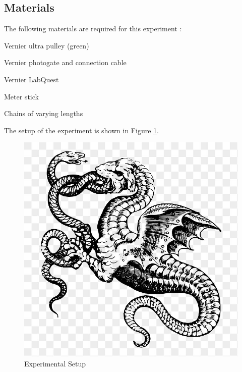 \documentclass[stu,biblatex,floatsintext,draftall]{apa7}
\begin{document}
\subsection{Materials}
The following materials are required for this experiment \parencite{Hilsdorf2023AtwoodsHeavyChainHandout}:
\begin{APAitemize}
	\item Vernier ultra pulley (green)
	\item Vernier photogate and connection cable
	\item Vernier LabQuest
	\item Meter stick
	\item Chains of varying lengths %
\end{APAitemize}
The setup of the experiment is shown in Figure \ref{fig:setup}.
\begin{figure}
	\centering
	\caption{Experimental Setup}
	\label{fig:setup}
	\includegraphics{dragon}
\end{figure}
\end{document}
